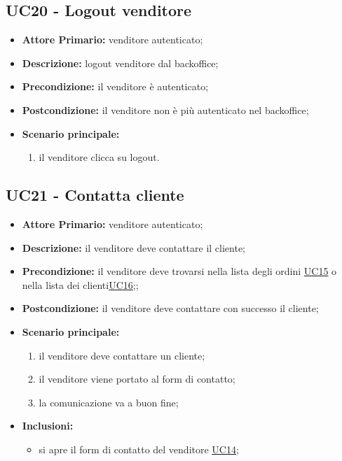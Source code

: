 \subsection{UC20 - Logout venditore}
\begin{itemize}
    \item \textbf{Attore Primario:} venditore autenticato;
    \item \textbf{Descrizione:} logout venditore dal backoffice;
    \item \textbf{Precondizione:} il venditore è autenticato;
    \item \textbf{Postcondizione:} il venditore non è più autenticato nel backoffice;
    \item \textbf{Scenario principale:}
    \begin{enumerate}
        \item il venditore clicca su logout.
    \end{enumerate}
\end{itemize}

\subsection{UC21 - Contatta cliente}
\label{UC21}
\begin{itemize}
    \item \textbf{Attore Primario:} venditore autenticato;
    \item \textbf{Descrizione:} il venditore deve contattare il cliente;
    \item \textbf{Precondizione:} il venditore deve trovarsi nella lista degli ordini \hyperref[UC15]{UC15} o nella lista dei clienti\hyperref[UC16]{UC16};;
    \item \textbf{Postcondizione:} il venditore deve contattare con successo il cliente;
    \item \textbf{Scenario principale:}
    \begin{enumerate}
        \item il venditore deve contattare un cliente;
        \item il venditore viene portato al form di contatto;
        \item la comunicazione va a buon fine;
    \end{enumerate}
    \item \textbf{Inclusioni:}
    \begin{itemize}
        \item si apre il form di contatto del venditore \hyperref[UC14]{UC14};
    \end{itemize}
\end{itemize}

